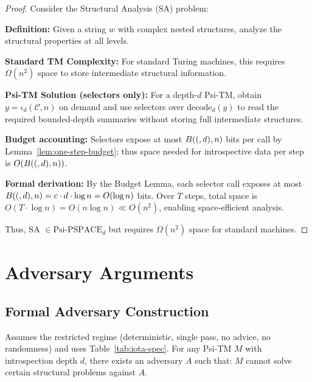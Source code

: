\begin{proof}
Consider the Structural Analysis (SA) problem:

\textbf{Definition:} Given a string $w$ with complex nested structures, analyze the structural properties at all levels.

\textbf{Standard TM Complexity:}
For standard Turing machines, this requires $\Omega(n^2)$ space to store intermediate structural information.

\textbf{Psi-TM Solution (selectors only):}
For a depth-$d$ Psi-TM, obtain $y=\iota_d(\mathcal{C},n)$ on demand and use selectors over $\mathrm{decode}_d(y)$ to read the required bounded-depth summaries without storing full intermediate structures.

\textbf{Budget accounting:}
Selectors expose at most $B((,d),n)$ bits per call by Lemma~\ref{lem:one-step-budget}; thus space needed for introspective data per step is $O(B((,d),n))$.

\textbf{Formal derivation:} By the Budget Lemma, each selector call exposes at most $B((,d),n) = c \cdot d \cdot \log n = O(\log n)$ bits. Over $T$ steps, total space is $O(T \cdot \log n) = O(n \log n) \ll O(n^2)$, enabling space-efficient analysis.

Thus, SA $\in \text{Psi-PSPACE}_d$ but requires $\Omega(n^2)$ space for standard machines.
\end{proof}

\section{Adversary Arguments}

\subsection{Formal Adversary Construction}

\begin{theorem}
Assumes the restricted regime (deterministic, single pass, no advice, no randomness) and uses Table~\ref{tab:iota-spec}.
For any Psi-TM $M$ with introspection depth $d$, there exists an adversary $A$ such that:
$M$ cannot solve certain structural problems against $A$.
\end{theorem}


